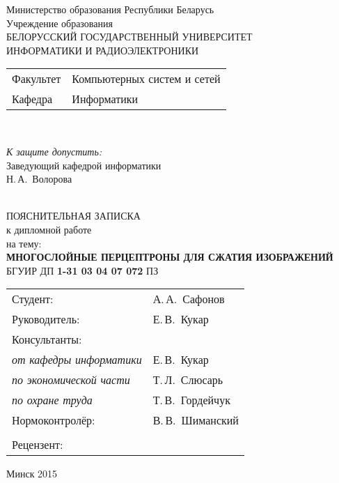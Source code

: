 \begin{titlepage}
  \begin{center}
	Министерство образования Республики Беларусь\\[1em]
	Учреждение образования\\
	БЕЛОРУССКИЙ ГОСУДАРСТВЕННЫЙ УНИВЕРСИТЕТ \\
	ИНФОРМАТИКИ И РАДИОЭЛЕКТРОНИКИ\\[1em]

	\begin{minipage}{\textwidth}
	  \begin{flushleft}
	    \begin{tabular}{ l l }
	      Факультет & Компьютерных систем и сетей\\
	      Кафедра   & Информатики
	    \end{tabular}
	  \end{flushleft}
	\end{minipage}\\[1em]

	\begin{minipage}{\textwidth}
	  \begin{flushright}
	    \textit{К защите допустить:}\\
	    Заведующий кафедрой информатики\\
	    \underline{\hspace*{4.5cm}} Н.\,А.~Волорова
	  \end{flushright}
	\end{minipage}\\[3em]

	{ПОЯСНИТЕЛЬНАЯ ЗАПИСКА}\\
	{к дипломной работе}\\
	{на тему:}\\[1em]
	\textbf{\large МНОГОСЛОЙНЫЕ ПЕРЦЕПТРОНЫ ДЛЯ СЖАТИЯ ИЗОБРАЖЕНИЙ}\\[1em]


	{БГУИР ДП \textbf{1-31 03 04 07 072} ПЗ}\\[2em]

	\begin{tabular}{ p{}p{} }
	  Студент: & А.\,А.~Сафонов \\
	  Руководитель: & Е.\,В.~Кукар \\
	  Консультанты: &\\
	  \hspace*{3ex}\emph{от кафедры информатики} & Е.\,В.~Кукар \\
	  \hspace*{3ex}\emph{по экономической части} & Т.\,Л.~Слюсарь \\
	  \hspace*{3ex}\emph{по охране труда} & Т.\,В.~Гордейчук \\
	  Нормоконтролёр: & В.\,В.~Шиманский\\
	  & \\
	  Рецензент: &  \\
	\end{tabular}

	\vfill
	{\normalsize Минск 2015}
  \end{center}
\end{titlepage}
